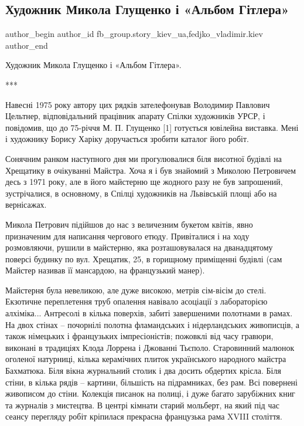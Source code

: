  
 
 
 
 
 
\subsection{Художник Микола Глущенко і «Альбом Гітлера»}
\label{sec:29_11_2021.fb.fb_group.story_kiev_ua.1.albom_gitlera_hudozhnik_gluschenko}
 
\ifcmt
 author_begin
   author_id fb_group.story_kiev_ua,fedjko_vladimir.kiev
 author_end
\fi

Художник Микола Глущенко і «Альбом Гітлера».

***

Навесні 1975 року автору цих рядків зателефонував Володимир Павлович Цельтнер,
відповідальний працівник апарату Спілки художників УРСР, і повідомив, що до
75-річчя М. П. Глущенко [1] готується ювілейна виставка. Мені і художнику
Борису Харіку доручається зробити каталог його робіт.

Сонячним ранком наступного дня ми прогулювалися біля висотної будівлі на
Хрещатику в очікуванні Майстра. Хоча я і був знайомий з Миколою Петровичем десь
з 1971 року, але в його майстерню ще жодного разу не був запрошений,
зустрічалися, в основному, в Спілці художників на Львівській площі або на
вернісажах.

Микола Петрович підійшов до нас з величезним букетом квітів, явно призначеним
для написання чергового етюду. Привіталися і на ходу розмовляючи, рушили в
майстерню, яка розташовувалася на дванадцятому поверсі будинку по вул.
Хрещатик, 25, в горищному приміщенні будівлі (сам Майстер називав її мансардою,
на французький манер).

Майстерня була невеликою, але дуже високою, метрів сім-вісім до стелі.
Екзотичне переплетення труб опалення навівало асоціації з лабораторією
алхіміка... Антресолі в кілька поверхів, забиті завершеними полотнами в рамах.
На двох стінах – почорнілі полотна фламандських і нідерландських живописців, а
також німецьких і французьких імпресіоністів; пожовклі від часу гравюри,
виконані в традиціях Клода Лоррена і Джованні Тьєполо. Старовинний малюнок
оголеної натурниці, кілька керамічних плиток українського народного майстра
Бахматюка. Біля вікна журнальний столик і два досить обдертих крісла. Біля
стіни, в кілька рядів – картини, більшість на підрамниках, без рам. Всі
повернені живописом до стіни. Колекція писанок на полиці, і дуже багато
зарубіжних книг та журналів з мистецтва. В центрі кімнати старий мольберт, на
який під час сеансу перегляду робіт кріпилася прекрасна французька рама XVIII
століття.

